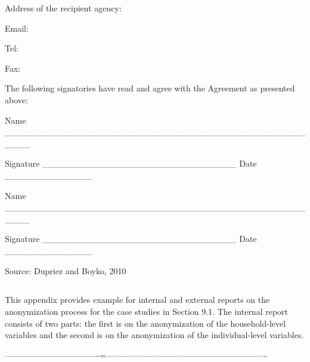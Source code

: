 \documentclass[letterpaper,10pt,english]{sphinxmanual}
\begin{document}
Address of the recipient agency:

Email:

Tel:

Fax:


The following signatories have read and agree with the Agreement as
presented above:


Name \_\_\_\_\_\_\_\_\_\_\_\_\_\_\_\_\_\_\_\_\_\_\_\_\_\_\_\_\_\_\_\_\_\_\_\_\_\_\_\_\_\_\_\_\_\_\_\_\_\_\_\_

Signature \_\_\_\_\_\_\_\_\_\_\_\_\_\_\_\_\_\_\_\_\_\_\_\_\_\_\_\_\_\_\_ Date \_\_\_\_\_\_\_\_\_\_\_\_\_\_


Name \_\_\_\_\_\_\_\_\_\_\_\_\_\_\_\_\_\_\_\_\_\_\_\_\_\_\_\_\_\_\_\_\_\_\_\_\_\_\_\_\_\_\_\_\_\_\_\_\_\_\_\_

Signature \_\_\_\_\_\_\_\_\_\_\_\_\_\_\_\_\_\_\_\_\_\_\_\_\_\_\_\_\_\_\_ Date \_\_\_\_\_\_\_\_\_\_\_\_\_\_

Source: Dupriez and Boyko, 2010


\section{  }
\label{\detokenize{appendices:appendix-c-internal-and-external-reports-for-case-studies}}
This appendix provides example for internal and external reports on the
anonymization process for the case studies in Section 9.1. The internal
report consists of two parts: the first is on the anonymization of the
household-level variables and the second is on the anonymization of the
individual-level variables.

 
———————————-=———————————————————-

\noindent{}



\chapter{}
\label{\detokenize{bibliography::doc}}\label{\detokenize{bibliography:bibliography}}
\end{document}
